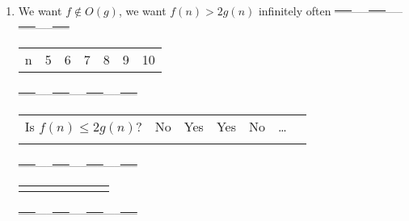 \documentclass[11pt]{article}
\begin{document}
\begin{itemize}
\begin{enumerate}
\item We want \(f \notin O(g)\), we want \(f(n) > 2 g(n)\) infinitely often
\sout{-----}-----\sout{-----}-----\sout{-----}-----\sout{-----}
\begin{center}
\begin{tabular}{lrrrrrr}
n & 5 & 6 & 7 & 8 & 9 & 10\\
\end{tabular}
\end{center}
\sout{-----}-----\sout{-----}-----\sout{-----}-----\sout{-----}
\begin{center}
\begin{tabular}{lllllll}
Is \(f(n) \leq 2g(n)\)? & No & Yes & Yes & No & \ldots{} & \\
 &  &  &  &  &  & \\
\end{tabular}
\end{center}
\sout{-----}-----\sout{-----}-----\sout{-----}-----\sout{-----}
\begin{center}
\begin{tabular}{lllllll}
 &  &  &  &  &  & \\
\end{tabular}
\end{center}
\sout{-----}-----\sout{-----}-----\sout{-----}-----\sout{-----}
\end{enumerate}
\end{itemize}
\end{document}
